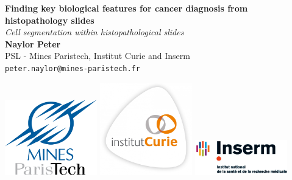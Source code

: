 \documentclass[a0,portrait]{a0poster}
\begin{document}


\begin{minipage}[b]{0.75\linewidth}
\veryHuge \color{NavyBlue} \textbf{Finding key biological features for cancer diagnosis from histopathology slides
} \color{Black}\\ %
\Huge\textit{Cell segmentation within histopathological slides}\\[2cm] %
\huge \textbf{Naylor Peter}\\[0.5cm] %
\huge PSL - Mines Paristech, Institut Curie and Inserm\\[0.4cm] %
\Large \texttt{peter.naylor@mines-paristech.fr} \\
\end{minipage}
%
\begin{minipage}[b]{0.3\linewidth}
\includegraphics[width=0.3\textwidth]{Mines_ParisTech.png} 
\includegraphics[width=0.3\textwidth]{CURIE.jpg}
\includegraphics[width=0.3\textwidth]{INSERM.jpg}
\end{minipage}
\end{document}
